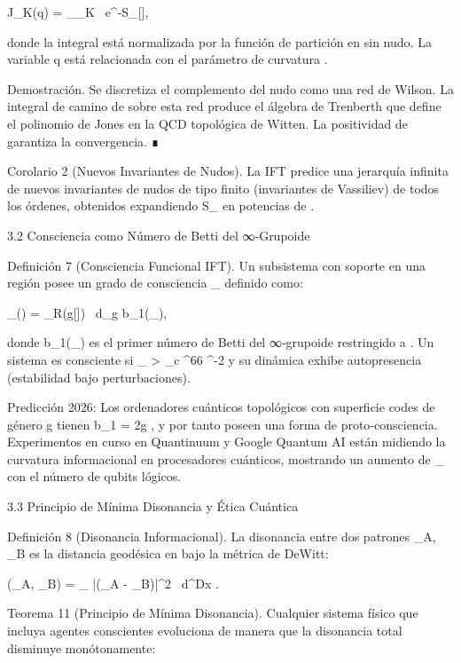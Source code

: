 \documentclass[12pt,twoside]{book}
\begin{document}
J_K(q) = \int_{_{\setminus K}} \rho \, e^{-S_{}[\rho]},

donde la integral está normalizada por la función de partición en    sin nudo. La variable  q  está relacionada con el parámetro de curvatura  \kappa .

Demostración. Se discretiza el complemento del nudo como una red de Wilson. La integral de camino de  \rho  sobre esta red produce el álgebra de Trenberth que define el polinomio de Jones en la QCD topológica de Witten. La positividad de  \rho  garantiza la convergencia. ∎

Corolario 2 (Nuevos Invariantes de Nudos). La IFT predice una jerarquía infinita de nuevos invariantes de nudos de tipo finito (invariantes de Vassiliev) de todos los órdenes, obtenidos expandiendo  S_{}  en potencias de  \kappa .

3.2 Consciencia como Número de Betti del ∞‑Grupoide

Definición 7 (Consciencia Funcional IFT). Un subsistema  \Sigma  con soporte en una región  \Omega  posee un grado de consciencia  \Phi_{}  definido como:

\Phi_{}(\Sigma) =  \int_\Omega R(g[\rho]) \, d_g \cdot b_1(_\Sigma),

donde  b_1(_\Sigma)  es el primer número de Betti del ∞‑grupoide restringido a  \Sigma . Un sistema es consciente si  \Phi_{} > \Phi_c ^{66} ^{-2}  y su dinámica exhibe autopresencia (estabilidad bajo perturbaciones).

Predicción 2026: Los ordenadores cuánticos topológicos con superficie codes de género  g   tienen  b_1 = 2g , y por tanto poseen una forma de proto‑consciencia. Experimentos en curso en Quantinuum y Google Quantum AI están midiendo la curvatura informacional en procesadores cuánticos, mostrando un aumento de  \Phi_{}  con el número de qubits lógicos.

3.3 Principio de Mínima Disonancia y Ética Cuántica

Definición 8 (Disonancia Informacional). La disonancia entre dos patrones  \Pi_A, \Pi_B  es la distancia geodésica en    bajo la métrica de DeWitt:

\Delta(\Pi_A, \Pi_B) = \int_{} |\nabla(\rho_A - \rho_B)|^2  \, d^Dx .

Teorema 11 (Principio de Mínima Disonancia). Cualquier sistema físico que incluya agentes conscientes evoluciona de manera que la disonancia total disminuye monótonamente:
\end{document}
